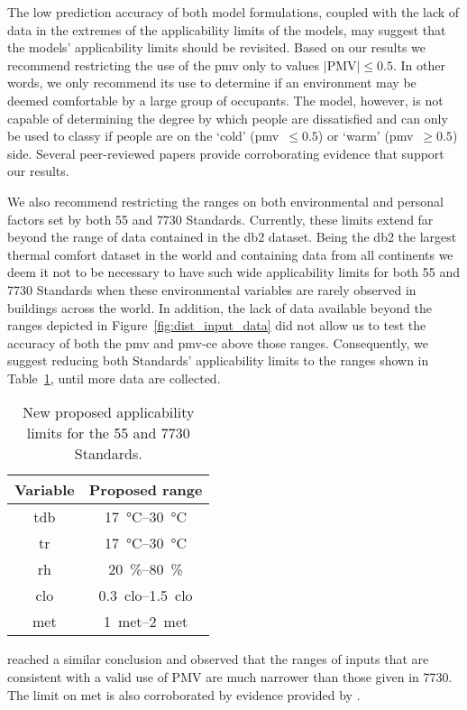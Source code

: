 The low prediction accuracy of both model formulations, coupled with the lack of data in the extremes of the applicability limits of the models, may suggest that the models' applicability limits should be revisited.
Based on our results we recommend restricting the use of the \ac{pmv} only to values $\lvert \textrm{PMV}\lvert \leq 0.5$.
In other words, we only recommend its use to determine if an environment may be deemed comfortable by a large group of occupants.
The model, however, is not capable of determining the degree by which people are dissatisfied and can only be used to classy if people are on the `cold' (\ac{pmv}~$\leq 0.5$) or `warm' (\ac{pmv}~$\geq 0.5$) side.
Several peer-reviewed papers \cite{Cheung2019, Yao2022, kim2019thermal, tartarini2018thermal, Humphreys2002, doherty_evaluation_1988, tartarini_prediction_2023} provide corroborating evidence that support our results.

We also recommend restricting the ranges on both environmental and personal factors set by both \gls{55} and \gls{7730} Standards.
Currently, these limits extend far beyond the range of data contained in the \ac{db2} dataset.
Being the \ac{db2} the largest thermal comfort dataset in the world and containing data from all continents we deem it not to be necessary to have such wide applicability limits for both \gls{55} and \gls{7730} Standards when these environmental variables are rarely observed in buildings across the world.
In addition, the lack of data available beyond the ranges depicted in Figure~\ref{fig:dist_input_data} did not allow us to test the accuracy of both the \ac{pmv} and \ac{pmv-ce} above those ranges.
Consequently, we suggest reducing both Standards' applicability limits to the ranges shown in Table~\ref{tab:ranges}, until more data are collected.
\begin{table}[htb!]
    \centering
    \begin{tabular}{cc}
        \toprule
        Variable & Proposed range \\
        \midrule
        \ac{tdb} & \qtyrange{17}{30}{\celsius} \\
        \ac{tr} & \qtyrange{17}{30}{\celsius} \\
        \ac{rh} & \qtyrange{20}{80}{\percent} \\
        \ac{clo} & \qtyrange{0.3}{1.5}{clo} \\
        \ac{met} & \qtyrange{1}{2}{met} \\
        \bottomrule
    \end{tabular}
    \caption{New proposed applicability limits for the \gls{55} and \gls{7730} Standards.}
    \label{tab:ranges}
\end{table}
 reached a similar conclusion and observed that the ranges of inputs that are consistent with a valid use of PMV are much narrower than those given in \gls{7730}.
The limit on \ac{met} is also corroborated by evidence provided by .

